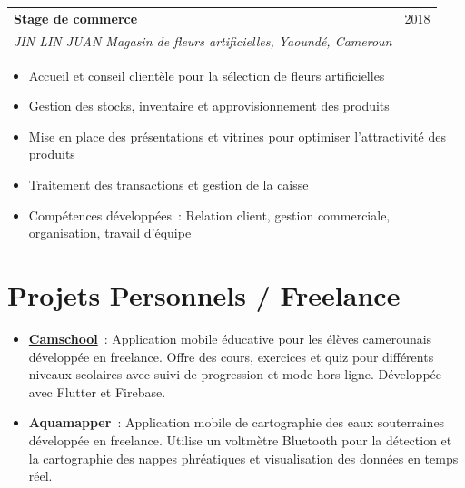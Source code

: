 \documentclass[12pt, a4paper]{article}
\begin{document}
\vspace{6pt}
\noindent\begin{tabularx}{\linewidth}{@{}X r@{}}
  {\bfseries\color{primary}Stage de commerce} &
  {\small\textcolor{textgray}{2018}} \\
  {\itshape\color{textgray} JIN LIN JUAN Magasin de fleurs artificielles, Yaound\'e, Cameroun} & \\
\end{tabularx}
\begin{itemize}[leftmargin=1.4em, itemsep=1pt, topsep=2pt, parsep=0pt]
  \item Accueil et conseil client\`ele pour la s\'election de fleurs artificielles
  \item Gestion des stocks, inventaire et approvisionnement des produits
  \item Mise en place des pr\'esentations et vitrines pour optimiser l'attractivit\'e des produits
  \item Traitement des transactions et gestion de la caisse
  \item Comp\'etences d\'evelopp\'ees~: Relation client, gestion commerciale, organisation, travail d'\'equipe
\end{itemize}


\newpage

\section{Projets Personnels / Freelance}

\begin{itemize}[leftmargin=1.4em, itemsep=2pt, topsep=2pt, parsep=0pt]
  \item \href{https://play.google.com/store/apps/details?id=org.camschool.app}{\textbf{Camschool}}~: Application mobile \'educative pour les \'el\`eves camerounais d\'evelopp\'ee en freelance. Offre des cours, exercices et quiz pour diff\'erents niveaux scolaires avec suivi de progression et mode hors ligne. D\'evelopp\'ee avec Flutter et Firebase.
  
  \item \textbf{Aquamapper}~: Application mobile de cartographie des eaux souterraines d\'evelopp\'ee en freelance. Utilise un voltm\`etre Bluetooth pour la d\'etection et la cartographie des nappes phr\'eatiques et visualisation des donn\'ees en temps r\'eel.
\end{itemize}
\end{document}
